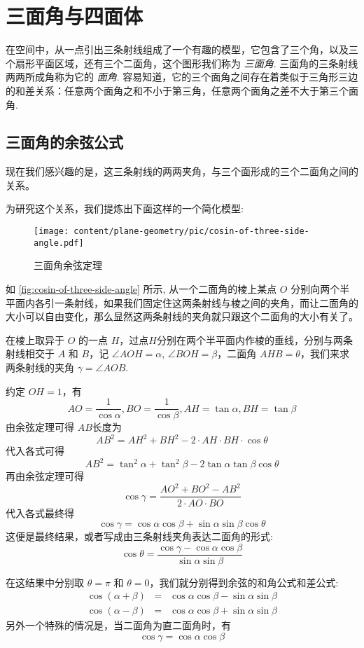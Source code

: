 
\section{三面角与四面体}
\label{sec:trihedral-angle}

在空间中，从一点引出三条射线组成了一个有趣的模型，它包含了三个角，以及三个扇形平面区域，还有三个二面角，这个图形我们称为 \emph{三面角}. 三面角的三条射线两两所成角称为它的 \emph{面角}. 容易知道，它的三个面角之间存在着类似于三角形三边的和差关系：任意两个面角之和不小于第三角，任意两个面角之差不大于第三个面角.


\subsection{三面角的余弦公式}
\label{sec:cosin-of-three-side-angle}


现在我们感兴趣的是，这三条射线的两两夹角，与三个面形成的三个二面角之间的关系。

为研究这个关系，我们提炼出下面这样的一个简化模型:


\begin{figure}[htbp]
\centering
\texttt{[image: content/plane-geometry/pic/cosin-of-three-side-angle.pdf]}
\caption{三面角余弦定理}
\label{fig:cosin-of-three-side-angle}
\end{figure}

如 \autoref{fig:cosin-of-three-side-angle} 所示, 从一个二面角的棱上某点 $O$ 分别向两个半平面内各引一条射线，如果我们固定住这两条射线与棱之间的夹角，而让二面角的大小可以自由变化，那么显然这两条射线的夹角就只跟这个二面角的大小有关了。

在棱上取异于 $O$ 的一点 $H$，过点$H$分别在两个半平面内作棱的垂线，分别与两条射线相交于 $A$ 和 $B$，记 $\angle AOH = \alpha$, $\angle BOH=\beta$，二面角 $AHB=\theta$，我们来求 两条射线的夹角 $\gamma = \angle AOB$.

约定 $OH = 1$，有
\[ AO = \frac{1}{\cos{\alpha}}, BO = \frac{1}{\cos{\beta}}, AH = \tan{\alpha}, BH = \tan{\beta} \]
由余弦定理可得 $AB$长度为
\[ AB^{2} = AH^2+BH^2-2 \cdot AH \cdot BH \cdot \cos{\theta} \]
代入各式可得
\[ AB^2 = \tan^2{\alpha} + \tan^2{\beta} - 2 \tan{\alpha} \tan{\beta} \cos{\theta} \]
再由余弦定理可得
\[ \cos{\gamma} = \frac{AO^2+BO^2-AB^2}{2 \cdot AO \cdot BO} \]
代入各式最终得
\[ \cos{\gamma} = \cos{\alpha}\cos{\beta}+\sin{\alpha}\sin{\beta}\cos{\theta} \]
这便是最终结果，或者写成由三条射线夹角表达二面角的形式:
\[ \cos{\theta} = \frac{\cos{\gamma}-\cos{\alpha}\cos{\beta}}{\sin{\alpha}\sin{\beta}} \]

在这结果中分别取 $\theta = \pi$ 和 $\theta = 0$，我们就分别得到余弦的和角公式和差公式:
\begin{eqnarray*}
  \cos{(\alpha+\beta)} & = & \cos{\alpha}\cos{\beta} - \sin{\alpha}\sin{\beta} \\
  \cos{(\alpha-\beta)} & = & \cos{\alpha}\cos{\beta} + \sin{\alpha}\sin{\beta} 
\end{eqnarray*}
另外一个特殊的情况是，当二面角为直二面角时，有
\[ \cos{\gamma} = \cos{\alpha}\cos{\beta} \]

